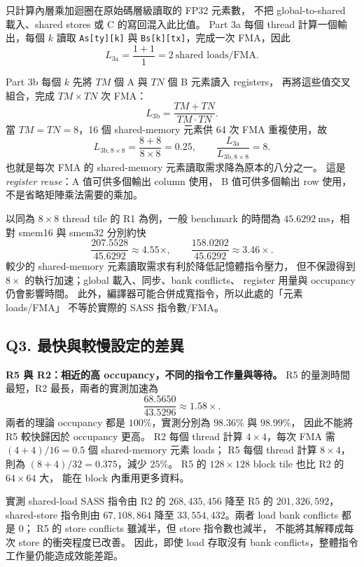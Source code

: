 \documentclass[UTF8,fontset=none,11pt,a4paper]{ctexart}
\begin{document}
只計算內層乘加迴圈在原始碼層級讀取的 FP32 元素數，
不把 global-to-shared 載入、shared stores 或 C 的寫回混入此比值。
Part 3a 每個 thread 計算一個輸出，每個 $k$ 讀取
\texttt{As[ty][k]} 與 \texttt{Bs[k][tx]}，完成一次 FMA，因此
\[
L_{\mathrm{3a}}=\frac{1+1}{1}=2\ \text{shared loads/FMA}.
\]

Part 3b 每個 $k$ 先將 $TM$ 個 A 與 $TN$ 個 B 元素讀入 registers，
再將這些值交叉組合，完成 $TM\times TN$ 次 FMA：
\[
L_{\mathrm{3b}}=\frac{TM+TN}{TM\cdot TN}.
\]
當 $TM=TN=8$，16 個 shared-memory 元素供 64 次 FMA 重複使用，故
\[
L_{\mathrm{3b},8\times8}=\frac{8+8}{8\times8}=0.25,
\qquad
\frac{L_{\mathrm{3a}}}{L_{\mathrm{3b},8\times8}}=8.
\]
也就是每次 FMA 的 shared-memory 元素讀取需求降為原本的八分之一。
這是 \emph{register reuse}：A 值可供多個輸出 column 使用，
B 值可供多個輸出 row 使用，不是省略矩陣乘法需要的乘加。

以同為 $8\times8$ thread tile 的 R1 為例，一般 benchmark 的時間為
$45.6292\ \mathrm{ms}$，相對 smem16 與 smem32 分別約快
\[
\frac{207.5528}{45.6292}\approx4.55\times,
\qquad
\frac{158.0202}{45.6292}\approx3.46\times.
\]
較少的 shared-memory 元素讀取需求有利於降低記憶體指令壓力，
但不保證得到 $8\times$ 的執行加速；global 載入、同步、bank conflicts、
register 用量與 occupancy 仍會影響時間。
此外，編譯器可能合併成寬指令，所以此處的「元素 loads/FMA」
不等於實際的 SASS 指令數/FMA。

\subsection*{Q3. 最快與較慢設定的差異}

\textbf{R5 與 R2：相近的高 occupancy，不同的指令工作量與等待。}
R5 的量測時間最短，R2 最長，兩者的實測加速為
\[
\frac{68.5650}{43.5296}\approx1.58\times.
\]
兩者的理論 occupancy 都是 $100\%$，實測分別為 $98.36\%$ 與 $98.99\%$，
因此不能將 R5 較快歸因於 occupancy 更高。
R2 每個 thread 計算 $4\times4$，每次 FMA 需
$(4+4)/16=0.5$ 個 shared-memory 元素 loads；
R5 每個 thread 計算 $8\times4$，則為 $(8+4)/32=0.375$，減少 $25\%$。
R5 的 $128\times128$ block tile 也比 R2 的 $64\times64$ 大，
能在 block 內重用更多資料。

實測 shared-load SASS 指令由 R2 的 $268{,}435{,}456$ 降至
R5 的 $201{,}326{,}592$，shared-store 指令則由 $67{,}108{,}864$
降至 $33{,}554{,}432$。兩者 load bank conflicts 都是 0；
R5 的 store conflicts 雖減半，但 store 指令數也減半，
不能將其解釋成每次 store 的衝突程度已改善。
因此，即使 load 存取沒有 bank conflicts，整體指令工作量仍能造成效能差距。
\end{document}
